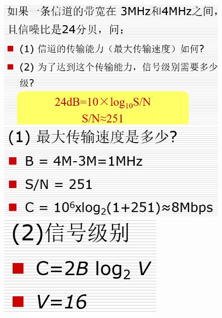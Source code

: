 \documentclass[UTF8,a4paper]{ctexart}
\begin{document}
  \begin{figure}[H]
    \centering
    \includegraphics[scale = 0.3]{assets/jisuanjiwangluo_81802.png}
    \includegraphics[scale = 0.3]{assets/jisuanjiwangluo_bef5b.png}
    \includegraphics[scale = 0.3]{assets/jisuanjiwangluo_af2c8.png}
  \end{figure}
\end{document}
